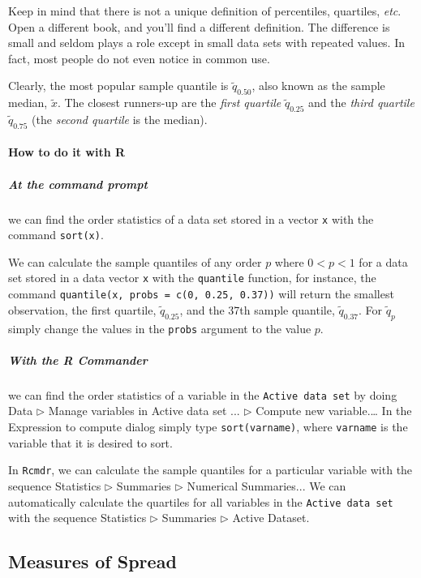 \documentclass[captions=tableheading]{scrbook}
\begin{document}
Keep in mind that there is not a unique definition of percentiles, quartiles, \emph{etc}. Open a different book, and you'll find a different definition. The difference is small and seldom plays a role except in small data sets with repeated values. In fact, most people do not even notice in common use.

Clearly, the most popular sample quantile is \(\tilde{q}_{0.50}\), also known as the sample median, \(\tilde{x}\). The closest runners-up are the \emph{first quartile} \(\tilde{q}_{0.25}\) and the \emph{third quartile} \(\tilde{q}_{0.75}\) (the \emph{second quartile} is the median). 


\paragraph*{How to do it with \textsf{R}}

\subparagraph*{At the command prompt}
we can find the order statistics of a data set stored in a vector \texttt{x} with the command \texttt{sort(x)}.

We can calculate the sample quantiles of any order \(p\) where \(0<p<1\) for a data set stored in a data vector \texttt{x} with the \texttt{quantile} function, for instance, the command \texttt{quantile(x, probs = c(0, 0.25, 0.37))} will return the smallest observation, the first quartile, \(\tilde{q}_{0.25}\), and the 37th sample quantile, \(\tilde{q}_{0.37}\). For \(\tilde{q}_{p}\) simply change the values in the \texttt{probs} argument to the value \(p\).


\subparagraph*{With the \textsf{R} Commander}
we can find the order statistics of a variable in the \texttt{Active data set} by doing \textsf{Data \(\triangleright\) Manage variables in Active data set ... \(\triangleright\) Compute new variable}.\ldots{} In the \textsf{Expression to compute} dialog simply type \texttt{sort(varname)}, where \texttt{varname} is the variable that it is desired to sort.

In \texttt{Rcmdr}, we can calculate the sample quantiles for a particular variable with the sequence \textsf{Statistics \(\triangleright\) Summaries \(\triangleright\) Numerical Summaries}... We can automatically calculate the quartiles for all variables in the \texttt{Active data set} with the sequence \textsf{Statistics \(\triangleright\) Summaries \(\triangleright\) Active Dataset}.
\subsection{Measures of Spread}
\label{sec-3-3-4}
\end{document}
